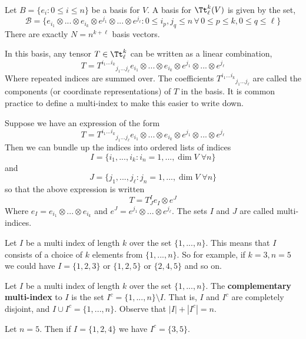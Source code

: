 \begin{thm} Let $B = \{e_i:0\leq i\leq n\}$ be a basis for $V$.
A basis for $\Tt_\ell^k(V)$ is given by the set,
\begin{equation}
    \mathcal{B} = \bigg\{e_{i_1}\otimes...\otimes e_{i_k}\otimes e^{j_1}\otimes...\otimes e^{j_\ell} : 0\leq i_p,j_q\leq n \, \forall\, 0\leq p\leq k, 0\leq q\leq \ell\bigg\}
\end{equation}
There are exactly $N=n^{k+\ell}$ basis vectors.
\end{thm}
In this basis, any tensor $T \in \Tt^k_\ell$ can be written as a linear combination,
\[T =  T^{i_1...i_k}{}_{j_1...j_\ell} e_{i_1}\otimes...\otimes e_{i_k}\otimes e^{j_1}\otimes...\otimes e^{j_\ell}\]
Where repeated indices are summed over. The coefficients $T^{i_1...i_k}{}_{j_1...j_\ell}$ are called the components (or coordinate representations) of $T$ in the basis. It is common practice to define a multi-index to make this easier to write down.
\begin{defn} Suppose we have an expression of the form \[T =  T^{i_1...i_k}{}_{j_1...j_\ell} e_{i_1}\otimes...\otimes e_{i_k}\otimes e^{j_1}\otimes...\otimes e^{j_\ell}\]
Then we can bundle up the indices into ordered lists of indices 
\[I=\{i_1,...,i_k : i_n = 1,...,\dim V\; \forall n\}\] 
and \[J=\{j_1,...,j_\ell: j_n = 1,...,\dim V\;\forall n\}\]
so that the above expression is written
\[T = T_J^I e_I \otimes e^J\]
Where $e_I = e_{i_1}\otimes...\otimes e_{i_k}$ and $e^J = e^{j_1}\otimes ...\otimes e^{j_\ell}$. The sets $I$ and $J$ are called multi-indices. 
    
\end{defn}
\begin{remark*}
    Let $I$ be a multi index of length $k$ over the set $\{1,...,n\}$. This means that $I$ consists of a choice of $k$ elements from $\{1,...,n\}$. So for example, if $k=3,n=5$ we could have $I = \{1,2,3\}$ or $\{1,2,5\}$ or $\{2,4,5\}$ and so on.
\end{remark*}
\begin{defn}
    Let $I$ be a multi index of length $k$ over the set $\{1,...,n\}$. The \textbf{complementary multi-index} to $I$ is the set $I^c = \{1,...,n\}\setminus I$. That is, $I$ and $I^c$ are completely disjoint, and $I\cup I^c = \{1,...,n\}$. Observe that $|I| +|I^c| = n$.
\end{defn}
\begin{example}
Let $n=5$. Then if $I= \{1,2,4\}$ we have $I^c = \{3,5\}$.
\end{example}

